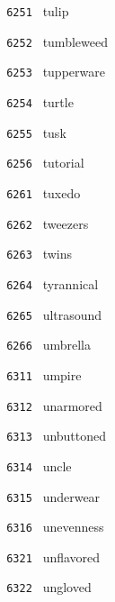 \documentclass[11pt]{article}
\begin{document}
\begin{multicols}{6}
\noindent \texttt{ 6251 } \hspace{1mm} tulip  \par
\noindent \texttt{ 6252 } \hspace{1mm} tumbleweed  \par
\noindent \texttt{ 6253 } \hspace{1mm} tupperware  \par
\noindent \texttt{ 6254 } \hspace{1mm} turtle  \par
\noindent \texttt{ 6255 } \hspace{1mm} tusk  \par
\noindent \texttt{ 6256 } \hspace{1mm} tutorial  \par
\noindent \texttt{ 6261 } \hspace{1mm} tuxedo  \par
\noindent \texttt{ 6262 } \hspace{1mm} tweezers  \par
\noindent \texttt{ 6263 } \hspace{1mm} twins  \par
\noindent \texttt{ 6264 } \hspace{1mm} tyrannical  \par
\noindent \texttt{ 6265 } \hspace{1mm} ultrasound  \par
\noindent \texttt{ 6266 } \hspace{1mm} umbrella  \par
\noindent \texttt{ 6311 } \hspace{1mm} umpire  \par
\noindent \texttt{ 6312 } \hspace{1mm} unarmored  \par
\noindent \texttt{ 6313 } \hspace{1mm} unbuttoned  \par
\noindent \texttt{ 6314 } \hspace{1mm} uncle  \par
\noindent \texttt{ 6315 } \hspace{1mm} underwear  \par
\noindent \texttt{ 6316 } \hspace{1mm} unevenness  \par
\noindent \texttt{ 6321 } \hspace{1mm} unflavored  \par
\noindent \texttt{ 6322 } \hspace{1mm} ungloved  \par

\end{multicols}
\end{document}
